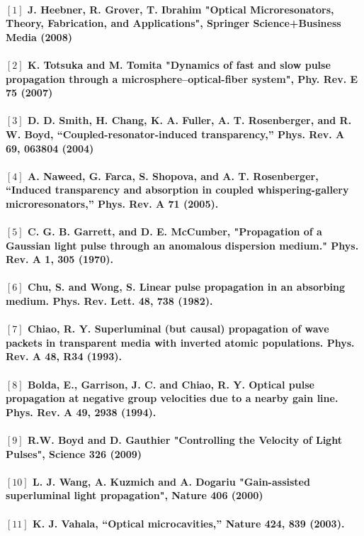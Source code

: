 \paragraph{\normalfont \large $[1]$ J. Heebner, R. Grover, T. Ibrahim "Optical Microresonators, Theory, Fabrication, and Applications", Springer Science+Business Media (2008)\\
\\ $[2]$ K. Totsuka and M. Tomita "Dynamics of fast and slow pulse propagation through a microsphere–optical-fiber system", Phy. Rev. E \textbf{75} (2007)\\
\\ $[3]$ D. D. Smith, H. Chang, K. A. Fuller, A. T. Rosenberger, and R. W. Boyd, “Coupled-resonator-induced
transparency,” Phys. Rev. A \textbf{69}, 063804 (2004)\\
\\ $[4]$ A. Naweed, G. Farca, S. Shopova, and A. T. Rosenberger, “Induced transparency and absorption in coupled
whispering-gallery microresonators,” Phys. Rev. A \textbf{71} (2005).\\
\\ $[5]$ C. G. B. Garrett, and D. E. McCumber,  "Propagation of a Gaussian light pulse through an anomalous dispersion medium." Phys. Rev. A \textbf{1}, 305 (1970).\\
\\ $[6]$ Chu, S. and Wong, S. Linear pulse propagation in an absorbing medium. Phys. Rev. Lett. \textbf{48}, 738
(1982).\\
\\ $[7]$ Chiao, R. Y. Superluminal (but causal) propagation of wave packets in transparent media with inverted atomic populations. Phys. Rev. A \textbf{48}, R34 (1993).\\
\\ $[8]$ Bolda, E., Garrison, J. C. and Chiao, R. Y. Optical pulse propagation at negative group velocities due to a nearby gain line. Phys. Rev. A \textbf{49}, 2938 (1994).\\
\\ $[9]$ R.W. Boyd and D. Gauthier "Controlling the Velocity of Light Pulses", Science \textbf{326} (2009)\\
\\ $[10]$ L. J. Wang, A. Kuzmich and A. Dogariu "Gain-assisted superluminal light propagation", Nature \textbf{406} (2000)\\
\\ $[11]$  K. J. Vahala, “Optical microcavities,” Nature \textbf{424}, 839 (2003).\\
}
